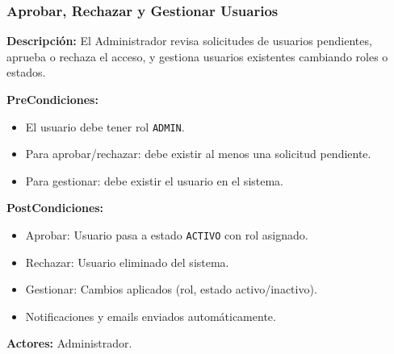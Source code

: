 \subsubsection{Aprobar, Rechazar y Gestionar Usuarios}

\textbf{Descripción:} El Administrador revisa solicitudes de usuarios pendientes, aprueba o rechaza el acceso, y gestiona usuarios existentes cambiando roles o estados.

\vspace{0.5em}
\noindent\textbf{PreCondiciones:}
\begin{itemize}[nosep]
    \item El usuario debe tener rol \texttt{ADMIN}.
    \item Para aprobar/rechazar: debe existir al menos una solicitud pendiente.
    \item Para gestionar: debe existir el usuario en el sistema.
\end{itemize}

\vspace{0.5em}
\noindent\textbf{PostCondiciones:}
\begin{itemize}[nosep]
    \item Aprobar: Usuario pasa a estado \texttt{ACTIVO} con rol asignado.
    \item Rechazar: Usuario eliminado del sistema.
    \item Gestionar: Cambios aplicados (rol, estado activo/inactivo).
    \item Notificaciones y emails enviados automáticamente.
\end{itemize}

\vspace{0.5em}
\noindent\textbf{Actores:} Administrador.

